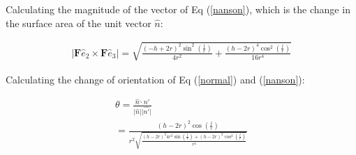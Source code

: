 \begin{problem}
Calculating the magnitude of the vector of Eq (\ref{nanson}), which is the change in the surface area of the unit vector $\hat{n}$:

\begin{align}
    \lvert \mathbf{F}\hat{e}_{2}\times \mathbf{F}\hat{e}_{3} \rvert = \sqrt{ \frac{(-h+2r)^2\sin^2\left( \frac{l}{r} \right)}{4r^2}+\frac{(h-2r)^4\cos^2\left( \frac{l}{r} \right)}{16r^4} }
    \end{align}

Calculating the change of orientation of Eq (\ref{normal}) and (\ref{nanson}):

\begin{align}
\theta=\frac{\hat{n}\hat{\cdot}n'}{\lvert \hat{n} \rvert \lvert \hat{n'} \rvert } \\
=\frac{(h-2r)^2\cos\left( \frac{l}{r} \right)}{r^2\sqrt{ \frac{(h-2r)^2 4r^2\sin\left( \frac{l}{r} \right)+(h-2r)^2\cos^2\left( \frac{l}{r} \right)}{r^4}}}
\end{align}


\end{problem}
